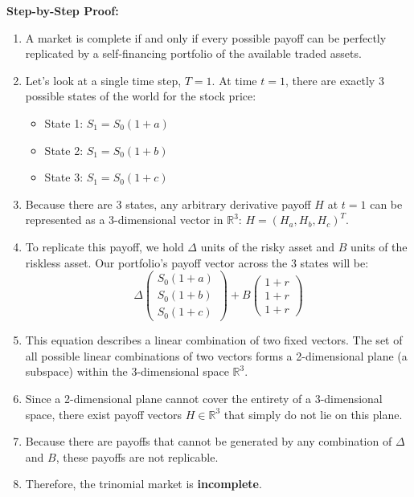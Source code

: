 \textbf{Step-by-Step Proof:}
\begin{enumerate}
    \item A market is complete if and only if every possible payoff can be perfectly replicated by a self-financing portfolio of the available traded assets.
    \item Let's look at a single time step, $T=1$. At time $t=1$, there are exactly 3 possible states of the world for the stock price:
    \begin{itemize}
        \item State 1: $S_1 = S_0(1+a)$
        \item State 2: $S_1 = S_0(1+b)$
        \item State 3: $S_1 = S_0(1+c)$
    \end{itemize}
    \item Because there are 3 states, any arbitrary derivative payoff $H$ at $t=1$ can be represented as a 3-dimensional vector in $\mathbb{R}^3$: $H = (H_a, H_b, H_c)^T$.
    \item To replicate this payoff, we hold $\Delta$ units of the risky asset and $B$ units of the riskless asset. Our portfolio's payoff vector across the 3 states will be:
    $$ \Delta \begin{pmatrix} S_0(1+a) \\ S_0(1+b) \\ S_0(1+c) \end{pmatrix} + B \begin{pmatrix} 1+r \\ 1+r \\ 1+r \end{pmatrix} $$
    \item This equation describes a linear combination of two fixed vectors. The set of all possible linear combinations of two vectors forms a 2-dimensional plane (a subspace) within the 3-dimensional space $\mathbb{R}^3$.
    \item Since a 2-dimensional plane cannot cover the entirety of a 3-dimensional space, there exist payoff vectors $H \in \mathbb{R}^3$ that simply do not lie on this plane. 
    \item Because there are payoffs that cannot be generated by any combination of $\Delta$ and $B$, these payoffs are not replicable. 
    \item Therefore, the trinomial market is \textbf{incomplete}.
\end{enumerate}